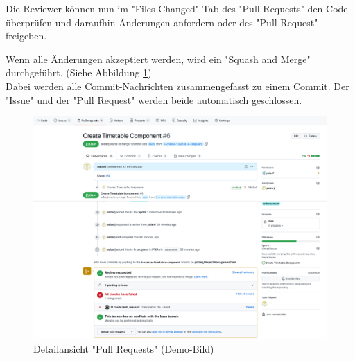 Die Reviewer können nun im "Files Changed" Tab des "Pull Requests" den Code überprüfen und daraufhin Änderungen anfordern oder des "Pull Request" freigeben. 


Wenn alle Änderungen akzeptiert werden, wird ein "Squash and Merge" durchgeführt. (Siehe Abbildung \ref{fig:pullInfo}) \\ Dabei werden alle Commit-Nachrichten zusammengefasst zu einem Commit. Der "Issue" und der "Pull Request" werden beide automatisch geschlossen.

\begin{figure}[H]
    \centering
    \includegraphics[width=\textwidth]{media/ProjectManagement/PullInfo.png}
    \caption{Detailansicht "Pull Requests" (Demo-Bild)}
    \label{fig:pullInfo}
\end{figure}

\cite{GithubFS}